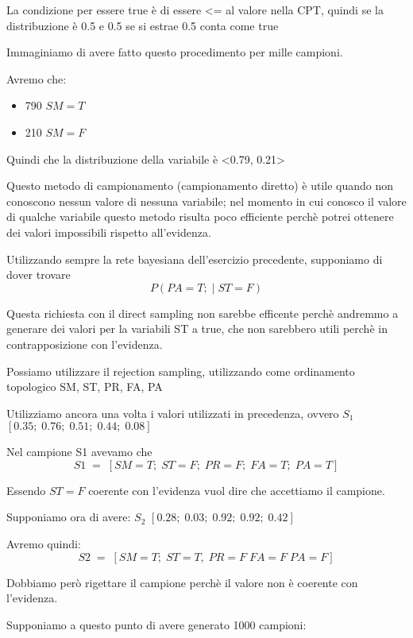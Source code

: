 \documentclass{article}
\begin{document}
\begin{mdframed}[hidealllines=true,backgroundcolor=blue!20]
	La condizione per essere true è di essere <=  al valore nella CPT, quindi se la distribuzione è 0.5 e 0.5 se si estrae 0.5 conta come true
\end{mdframed}

\pagebreak

Immaginiamo di avere fatto questo procedimento per mille campioni.

Avremo che:
\begin{itemize}
	\item 790 \(SM = T\)
	\item 210 \(SM = F\)
\end{itemize}

Quindi che la distribuzione della variabile è <0.79, 0.21>


Questo metodo di campionamento (campionamento diretto) è utile quando non conoscono nessun valore di nessuna variabile; nel momento in cui conosco il valore di qualche variabile questo metodo risulta poco efficiente perchè potrei ottenere dei valori impossibili rispetto all'evidenza.

Utilizzando sempre la rete bayesiana dell'esercizio precedente,
supponiamo di dover trovare
\[
P(PA = T; \; | \; ST = F)
\]

Questa richiesta con il direct sampling non sarebbe efficente perchè andremmo a generare dei valori per la variabili ST a true, che non sarebbero utili perchè in contrapposizione con l'evidenza.

Possiamo utilizzare il rejection sampling, utilizzando come ordinamento topologico
SM, ST, PR, FA, PA

Utilizziamo ancora una volta i valori utilizzati in precedenza, ovvero $S_1$ \([0.35; \; 0.76; \; 0.51; \; 0.44; \; 0.08]\)

Nel campione S1 avevamo che 
\[
S1 \; = \; [SM = T; \; ST = F; \; PR = F; \; FA = T; \;  PA = T]
\]

Essendo \(ST = F\) coerente con l'evidenza vuol dire che accettiamo il campione.

Supponiamo ora di avere:
$S_2$ \([0.28; \; 0.03; \; 0.92; \; 0.92; \; 0.42]\)

Avremo quindi:
\[
S2 \; = \; [SM = T; \; ST = T, \; PR = F \; FA = F\; PA = F]
\]

Dobbiamo però rigettare il campione perchè il valore non è coerente con l'evidenza.

Supponiamo a questo punto di avere generato 1000 campioni:
\end{document}
